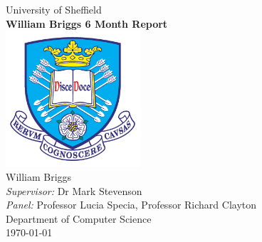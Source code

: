 \documentclass[11pt,oneside]{book}
\begin{document}
\begin{titlepage}


\begin{center}
{\LARGE University of Sheffield}\\[1.5cm]
\linespread{1.2}\huge {\bfseries William Briggs 6 Month Report}\\[1.5cm]
\linespread{1}
\includegraphics[width=5cm]{images/tuoslogo.png}\\[1cm]
{\Large William Briggs}\\[1cm]
{\large \emph{Supervisor:} Dr Mark Stevenson}\\[1cm]
{\large \emph{Panel:} Professor Lucia Specia, Professor Richard Clayton}\\[1cm]
Department of Computer Science\\[2cm]
\today
\end{center}

\end{titlepage}







\tableofcontents
\listoffigures
\listoftables


\mainmatter


 
  
 
 
 
 
% 
%
% 
 
 
\end{document}

